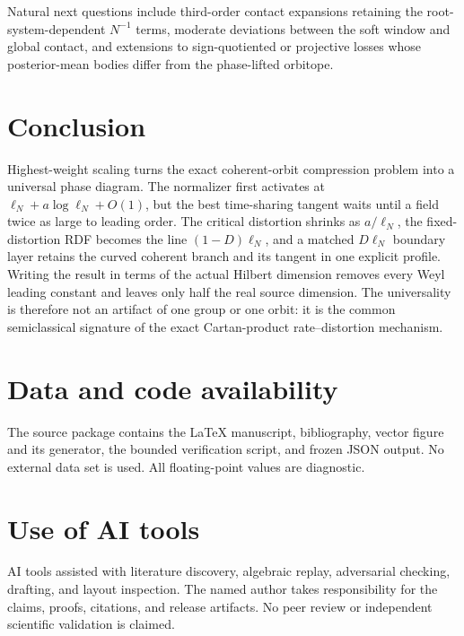 \documentclass[11pt]{article}
\begin{document}
Natural next questions include third-order contact expansions retaining the
root-system-dependent $N^{-1}$ terms, moderate deviations between the soft
window and global contact, and extensions to sign-quotiented or projective
losses whose posterior-mean bodies differ from the phase-lifted orbitope.

\section{Conclusion}

Highest-weight scaling turns the exact coherent-orbit compression problem
into a universal phase diagram.  The normalizer first activates at
$\ell_N+a\log\ell_N+O(1)$, but the best time-sharing tangent waits until a
field twice as large to leading order.  The critical distortion shrinks as
$a/\ell_N$, the fixed-distortion RDF becomes the line $(1-D)\ell_N$, and a
matched $D\ell_N$ boundary layer retains the curved coherent branch and its
tangent in one explicit profile.  Writing the result in terms of the actual
Hilbert dimension removes every Weyl leading constant and leaves only half
the real source dimension.  The universality is therefore not an artifact of
one group or one orbit: it is the common semiclassical signature of the exact
Cartan-product rate--distortion mechanism.

\section*{Data and code availability}

The source package contains the LaTeX manuscript, bibliography, vector figure
and its generator, the bounded verification script, and frozen JSON output.
No external data set is used.  All floating-point values are diagnostic.

\section*{Use of AI tools}

AI tools assisted with literature discovery, algebraic replay, adversarial
checking, drafting, and layout inspection.  The named author takes
responsibility for the claims, proofs, citations, and release artifacts.  No
peer review or independent scientific validation is claimed.

\printbibliography
\end{document}
